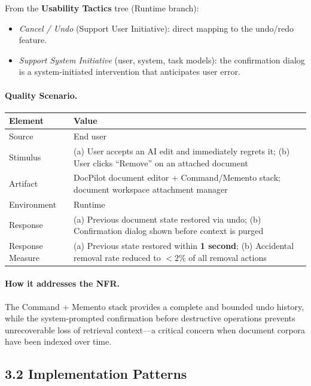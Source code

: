 \documentclass[12pt,a4paper]{article}
\begin{document}
From the \textbf{Usability Tactics} tree (Runtime branch):
\begin{itemize}[nosep]
    \item \textit{Cancel / Undo} (Support User Initiative): direct mapping to the undo/redo
    feature.
    \item \textit{Support System Initiative} (user, system, task models): the confirmation dialog
    is a system-initiated intervention that anticipates user error.
\end{itemize}

\paragraph{Quality Scenario.}

\begin{center}
\begin{tabular}{@{}L{3.5cm}L{9cm}@{}}
\toprule
\textbf{Element} & \textbf{Value} \\
\midrule
Source & End user \\
Stimulus & (a) User accepts an AI edit and immediately regrets it; (b) User clicks ``Remove'' on an attached document \\
Artifact & DocPilot document editor + Command/Memento stack; document workspace attachment manager \\
Environment & Runtime \\
Response & (a) Previous document state restored via undo; (b) Confirmation dialog shown before context is purged \\
Response Measure & (a) Previous state restored within \textbf{1 second}; (b) Accidental removal rate reduced to $< 2\%$ of all removal actions \\
\bottomrule
\end{tabular}
\end{center}

\paragraph{How it addresses the NFR.}
The Command + Memento stack provides a complete and bounded undo history, while the system-prompted
confirmation before destructive operations prevents unrecoverable loss of retrieval context---a
critical concern when document corpora have been indexed over time.

\subsection{3.2 Implementation Patterns}
\end{document}
